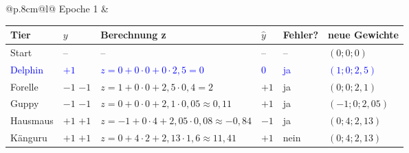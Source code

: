 \noindent\begin{tabular}{@{}p{.8cm}@{}l@{}}
\hspace{-0.5cm}\tiny{Epoche 1} &
\begin{tabular}{|>{\centering\arraybackslash}p{1.7cm}|>{\centering\arraybackslash}p{0.8cm}|p{6cm}|>{\centering\arraybackslash}p{0.8cm}|>{\centering\arraybackslash}p{1.2cm}|>{\centering\arraybackslash}p{2.4cm}|}
\hline
Tier & $y$ & Berechnung z & $\hat y$ & \small{Fehler?} & \small{neue Gewichte} \\
\hline
Start & -- & -- & -- & -- & $(0; 0; 0)$ \\
\hline
\textcolor{blue}{Delphin} & \textcolor{blue}{$+1$} & \textcolor{blue}{$z = 0 + 0\cdot0 + 0\cdot2{,}5 = 0$} & \textcolor{blue}{$0$} & \textcolor{blue}{ja} & \textcolor{blue}{$(1;0;2{,}5)$} \\[8pt]
\hline
Forelle & \ifdefined\zeigloesungen \textcolor{loesgruen}{$-1$} \else $-1$ \fi & \ifdefined\zeigloesungen \textcolor{loesgruen}{$z = 1 + 0\cdot0 + 2{,}5\cdot0{,}4 = 2$} \fi & \ifdefined\zeigloesungen \textcolor{loesgruen}{$+1$} \fi & \ifdefined\zeigloesungen \textcolor{loesgruen}{ja} \fi & \ifdefined\zeigloesungen \textcolor{loesgruen}{$(0;0;2{,}1)$} \fi \\[8pt]
\hline
Guppy & \ifdefined\zeigloesungen \textcolor{loesgruen}{$-1$} \else $-1$ \fi & \ifdefined\zeigloesungen \textcolor{loesgruen}{$z = 0 + 0\cdot0 + 2{,}1\cdot0{,}05 \approx 0{,}11$} \fi & \ifdefined\zeigloesungen \textcolor{loesgruen}{$+1$} \fi & \ifdefined\zeigloesungen \textcolor{loesgruen}{ja} \fi & \ifdefined\zeigloesungen \textcolor{loesgruen}{$(-1;0;2{,}05)$} \fi \\[8pt]
\hline
Hausmaus & \ifdefined\zeigloesungen \textcolor{loesgruen}{$+1$} \else $+1$ \fi & \ifdefined\zeigloesungen \textcolor{loesgruen}{$z = {-1} + 0\cdot4 + 2{,}05\cdot0{,}08 \approx {-0{,}84}$} \fi & \ifdefined\zeigloesungen \textcolor{loesgruen}{$-1$} \fi & \ifdefined\zeigloesungen \textcolor{loesgruen}{ja} \fi & \ifdefined\zeigloesungen \textcolor{loesgruen}{$(0;4;2{,}13)$} \fi \\[8pt]
\hline
Känguru & \ifdefined\zeigloesungen \textcolor{loesgruen}{$+1$} \else $+1$ \fi & \ifdefined\zeigloesungen \textcolor{loesgruen}{$z = 0 + 4\cdot2 + 2{,}13\cdot1{,}6 \approx 11{,}41$} \fi & \ifdefined\zeigloesungen \textcolor{loesgruen}{$+1$} \fi & \ifdefined\zeigloesungen \textcolor{loesgruen}{nein} \fi & \ifdefined\zeigloesungen \textcolor{loesgruen}{$(0;4;2{,}13)$} \fi \\[8pt]
\hline
\end{tabular}
\end{tabular}
\medskip

